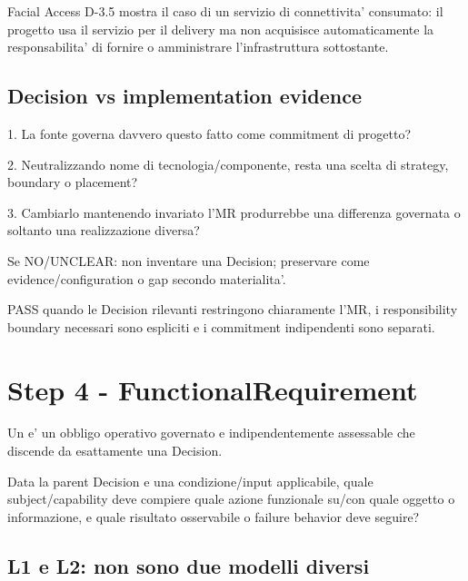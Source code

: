 \documentclass[11pt,a4paper]{article}
\begin{document}
Facial Access D-3.5 mostra il caso di un servizio di connettivita' consumato: il progetto usa il servizio per il delivery ma non acquisisce automaticamente la responsabilita' di fornire o amministrare l'infrastruttura sottostante.

\subsection{Decision vs implementation evidence}
\holdouttag

\begin{ddtacheck}[title={Test DermaTriage per un technical fact}]
1. La fonte governa davvero questo fatto come commitment di progetto?\par
2. Neutralizzando nome di tecnologia/componente, resta una scelta di strategy, boundary o placement?\par
3. Cambiarlo mantenendo invariato l'MR produrrebbe una differenza governata o soltanto una realizzazione diversa?\par
Se NO/UNCLEAR: non inventare una Decision; preservare come evidence/configuration o gap secondo materialita'.
\end{ddtacheck}

\begin{ddtacheck}[title={Gate D2 - Decision + STOP}]
PASS quando le Decision rilevanti restringono chiaramente l'MR, i responsibility boundary necessari sono espliciti e i commitment indipendenti sono separati.
\end{ddtacheck}

\section{Step 4 - FunctionalRequirement}
\closedtag

Un \FR{} e' un obbligo operativo governato e indipendentemente assessable che discende da esattamente una Decision.

\begin{ddtacheck}[title={Domanda fondamentale}]
Data la parent Decision e una condizione/input applicabile, quale subject/capability deve compiere quale azione funzionale su/con quale oggetto o informazione, e quale risultato osservabile o failure behavior deve seguire?
\end{ddtacheck}

\subsection{L1 e L2: non sono due modelli diversi}
\end{document}
